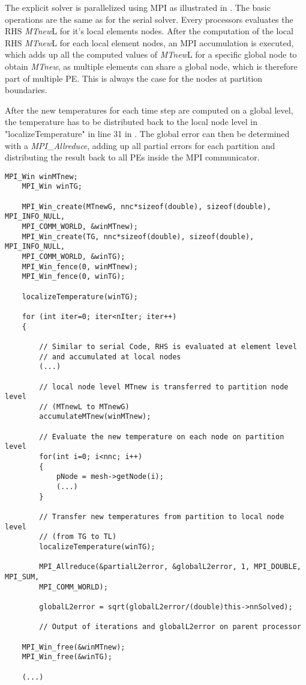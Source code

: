 The explicit solver is parallelized using MPI as illustrated in . The basic operations are the same as for the serial solver. Every processors evaluates the RHS \textit{MTnew}L for it's local elements nodes. After the computation of the local RHS \textit{MTnew}L for each local element nodes, an MPI accumulation is executed, which adds up all the computed values of \textit{MTnew}L for a specific global node to obtain \textit{MTnew}, as multiple elements can share a global node, which is therefore part of multiple PE. This is always the case for the nodes at partition boundaries.

After the new temperatures for each time step are computed on a global level, the temperature has to be distributed back to the local node level in "localizeTemperature" in line 31 in . The global error can then be determined with a \textit{MPI\_Allreduce}, adding up all partial errors for each partition and distributing the result back to all PEs inside the MPI communicator. 

\begin{lstlisting}[caption={\label{Code:MPI3} Explicit solver for MPI parallelization}]
	MPI_Win winMTnew;
	MPI_Win winTG;
	
	MPI_Win_create(MTnewG, nnc*sizeof(double), sizeof(double), MPI_INFO_NULL, 
	MPI_COMM_WORLD, &winMTnew);
	MPI_Win_create(TG, nnc*sizeof(double), sizeof(double), MPI_INFO_NULL, 
	MPI_COMM_WORLD, &winTG);
	MPI_Win_fence(0, winMTnew);
	MPI_Win_fence(0, winTG);
	
	localizeTemperature(winTG);
	
	for (int iter=0; iter<nIter; iter++)
	{
		
		// Similar to serial Code, RHS is evaluated at element level
		// and accumulated at local nodes
		(...)
		 
		// local node level MTnew is transferred to partition node level 
		// (MTnewL to MTnewG)
		accumulateMTnew(winMTnew);
		
		// Evaluate the new temperature on each node on partition level
		for(int i=0; i<nnc; i++)
		{
			pNode = mesh->getNode(i);
			(...)
		}
		
		// Transfer new temperatures from partition to local node level 
		// (from TG to TL)
		localizeTemperature(winTG);
		
		MPI_Allreduce(&partialL2error, &globalL2error, 1, MPI_DOUBLE, MPI_SUM, 
		MPI_COMM_WORLD);
		
		globalL2error = sqrt(globalL2error/(double)this->nnSolved);
		
		// Output of iterations and globalL2error on parent processor
	
	MPI_Win_free(&winMTnew);
	MPI_Win_free(&winTG);
	
	(...)
\end{lstlisting}

